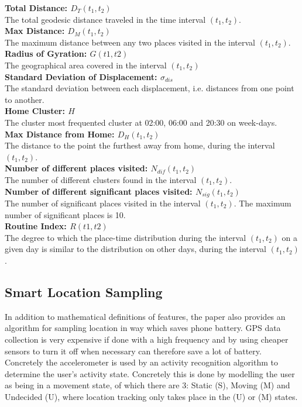 \textbf{Total Distance: $D_T (t_1, t_2)$}\\
The total geodesic distance traveled in the time interval $(t_1, t_2)$.\\

\textbf{Max Distance: $D_M (t_1, t_2)$}\\
The maximum distance between any two places visited in the interval $(t_1, t_2)$.\\

\textbf{Radius of Gyration: $G(t1, t2)$}\\
The geographical area covered in the interval $(t_1, t_2)$\\

\textbf{Standard Deviation of Displacement: $\sigma_{dis}$}\\
The standard deviation between each displacement, i.e. distances from one point to another.\\

\textbf{Home Cluster: $H$}\\
The cluster most frequented cluster at 02:00, 06:00 and 20:30 on week-days.\\

\textbf{Max Distance from Home: $D_H(t_1, t_2)$}\\
The distance to the point the furthest away from home, during the interval $(t_1, t_2)$.\\

\textbf{Number of different places visited: $N_{dif} (t_1, t_2)$}\\
The number of different clusters found in the interval $(t_1, t_2)$.\\

\textbf{Number of different significant places visited: $N_{sig} (t_1, t_2)$}\\
The number of significant places visited in the interval $(t_1, t_2)$. The maximum number of significant places is 10.\\

\textbf{Routine Index: $R(t1, t2)$}\\
The degree to which the place-time distribution during the interval $(t_1, t_2)$ on a given day is similar to the distribution on other days, during the interval $(t_1, t_2)$.\\

\subsection{Smart Location Sampling}
In addition to mathematical definitions of features, the paper also provides an algorithm for sampling location in way which saves phone battery. GPS data collection is very expensive if done with a high frequency and by using cheaper sensors to turn it off when necessary can therefore save a lot of battery. Concretely the accelerometer is used by an activity recognition algorithm to determine the user's activity state. Concretely this is done by modelling the user as being in a movement state, of which there are 3: Static (S), Moving (M) and Undecided (U), where location tracking only takes place in the (U) or (M) states. \\

